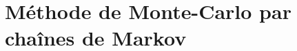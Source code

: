 \documentclass{presentation_template}
\begin{document}
\section{Méthode de Monte-Carlo par chaînes de Markov}
%

%
\end{document}
